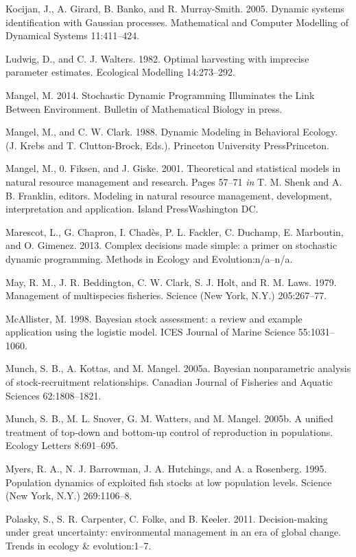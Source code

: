 \documentclass[author-year, 12pt,review]{components/elsarticle} %
\begin{document}
Kocijan, J., A. Girard, B. Banko, and R. Murray-Smith. 2005. Dynamic
systems identification with Gaussian processes. Mathematical and
Computer Modelling of Dynamical Systems 11:411--424.

Ludwig, D., and C. J. Walters. 1982. Optimal harvesting with imprecise
parameter estimates. Ecological Modelling 14:273--292.

Mangel, M. 2014. Stochastic Dynamic Programming Illuminates the Link
Between Environment. Bulletin of Mathematical Biology in press.

Mangel, M., and C. W. Clark. 1988. Dynamic Modeling in Behavioral
Ecology. (J. Krebs and T. Clutton-Brock, Eds.). Princeton University
PressPrinceton.

Mangel, M., 0. Fiksen, and J. Giske. 2001. Theoretical and statistical
models in natural resource management and research. Pages 57--71
\emph{in} T. M. Shenk and A. B. Franklin, editors. Modeling in natural
resource management, development, interpretation and application. Island
PressWashington DC.

Marescot, L., G. Chapron, I. Chadès, P. L. Fackler, C. Duchamp, E.
Marboutin, and O. Gimenez. 2013. Complex decisions made simple: a primer
on stochastic dynamic programming. Methods in Ecology and
Evolution:n/a--n/a.

May, R. M., J. R. Beddington, C. W. Clark, S. J. Holt, and R. M. Laws.
1979. Management of multispecies fisheries. Science (New York, N.Y.)
205:267--77.

McAllister, M. 1998. Bayesian stock assessment: a review and example
application using the logistic model. ICES Journal of Marine Science
55:1031--1060.

Munch, S. B., A. Kottas, and M. Mangel. 2005a. Bayesian nonparametric
analysis of stock-recruitment relationships. Canadian Journal of
Fisheries and Aquatic Sciences 62:1808--1821.

Munch, S. B., M. L. Snover, G. M. Watters, and M. Mangel. 2005b. A
unified treatment of top-down and bottom-up control of reproduction in
populations. Ecology Letters 8:691--695.

Myers, R. A., N. J. Barrowman, J. A. Hutchings, and A. a Rosenberg.
1995. Population dynamics of exploited fish stocks at low population
levels. Science (New York, N.Y.) 269:1106--8.

Polasky, S., S. R. Carpenter, C. Folke, and B. Keeler. 2011.
Decision-making under great uncertainty: environmental management in an
era of global change. Trends in ecology \& evolution:1--7.
\end{document}
